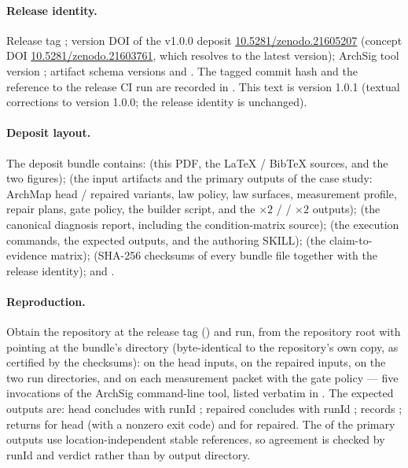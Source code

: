 \paragraph{Release identity.}
Release tag ; version DOI of the v1.0.0 deposit
\href{https://doi.org/10.5281/zenodo.21605207}{10.5281/zenodo.21605207}
(concept DOI \href{https://doi.org/10.5281/zenodo.21603761}{10.5281/zenodo.21603761},
which resolves to the latest version); ArchSig tool version ; artifact schema versions
 and
. The tagged commit hash and the
reference to the release CI run are recorded in .
This text is version 1.0.1 (textual corrections to version 1.0.0; the
release identity is unchanged).

\paragraph{Deposit layout.}
The deposit bundle  contains:
 (this PDF, the \LaTeX{} / BibTeX sources, and the two
figures);  (the input artifacts and the primary
outputs of the case study: ArchMap head / repaired variants, law
policy, law surfaces, measurement profile, repair plans, gate policy,
the builder script, and the  $\times2$ / 
/  $\times2$ outputs);  (the canonical
diagnosis report, including the condition-matrix source);
 (the execution commands, the expected outputs,
and the authoring SKILL);  (the claim-to-evidence
matrix);  (SHA-256 checksums of every bundle file
together with the release identity); and .

\paragraph{Reproduction.}
Obtain the repository at the release tag
(\allowbreak{}) and run, from the
repository root with  pointing at the bundle's
 directory (byte-identical to the repository's own
copy, as certified by the checksums):
 on the head inputs,  on the repaired
inputs,  on the two run directories, and  on
each measurement packet with the gate policy --- five invocations of
the ArchSig command-line tool, listed verbatim in
. The expected outputs are: head
 concludes  with
runId ; repaired  concludes
 with runId
;  records
;
 returns  for head (with a
nonzero exit code) and  for
repaired. The  of the primary outputs use
location-independent stable references, so agreement is checked by
runId and verdict rather than by output directory.
